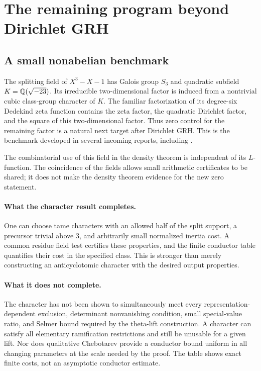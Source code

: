 \section{The remaining program beyond Dirichlet GRH}
\label{sec:program}

\subsection{A small nonabelian benchmark}

The splitting field of $X^3-X-1$ has Galois group $S_3$ and quadratic
subfield $K=\mathbb Q(\sqrt{-23})$. Its irreducible two-dimensional factor
is induced from a nontrivial cubic class-group character of $K$.
The familiar factorization of its degree-six Dedekind zeta function
contains the zeta factor, the quadratic Dirichlet factor, and the
square of this two-dimensional factor.  Thus zero control for the
remaining factor is a natural next target after Dirichlet GRH.
This is the benchmark developed in several incoming reports,
including \cite{prior-bridges,prior-synthesis}.

The combinatorial use of this field in the density theorem is
independent of its $L$-function. The coincidence of the fields allows
small arithmetic certificates to be shared; it does not make the
density theorem evidence for the new zero statement.

\paragraph{What the character result completes.}
One can choose tame characters with an allowed half of the split
support, a precursor trivial above $3$, and arbitrarily small
normalized inertia cost. A common residue field test certifies these
properties, and the finite conductor table quantifies their cost in
the specified class. This is stronger than merely constructing an
anticyclotomic character with the desired output properties.

\paragraph{What it does not complete.}
The character has not been shown to simultaneously meet every
representation-dependent exclusion, determinant nonvanishing
condition, small special-value ratio, and Selmer bound required by
the theta-lift construction. A character can satisfy all elementary
ramification restrictions and still be unusable for a given lift.
Nor does qualitative Chebotarev provide a conductor bound uniform in
all changing parameters at the scale needed by the proof. The table
shows exact finite costs, not an asymptotic conductor estimate.

